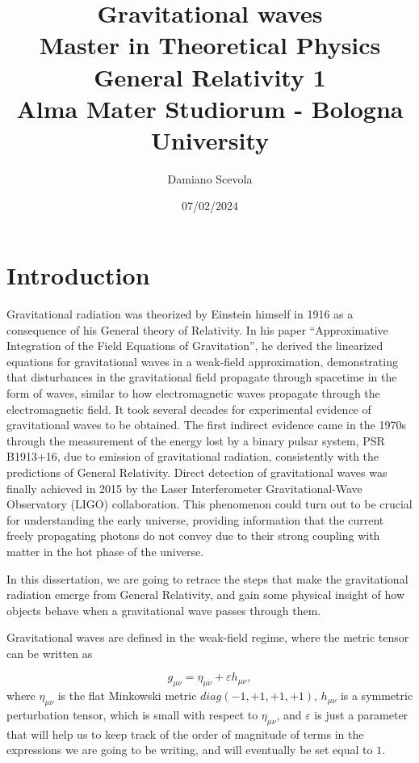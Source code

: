 \documentclass[a4paper]{article}
\title{Gravitational waves\\\linespread{1.5}
\small Master in Theoretical Physics\\
General Relativity 1\\
Alma Mater Studiorum - Bologna University}
\author{Damiano Scevola}
\date{07/02/2024}
\begin{document}
\maketitle


\section{Introduction}
Gravitational radiation was theorized by Einstein himself in 1916 as a consequence of his General theory of Relativity. In his paper ``Approximative Integration of the Field Equations of Gravitation'', he derived the linearized equations for gravitational waves in a weak-field approximation, demonstrating that disturbances in the gravitational field propagate through spacetime in the form of waves, similar to how electromagnetic waves propagate through the electromagnetic field. It took several decades for experimental evidence of gravitational waves to be obtained. The first indirect evidence came in the 1970s through the measurement of the energy lost by a binary pulsar system, PSR B1913+16, due to emission of gravitational radiation, consistently with the predictions of General Relativity. Direct detection of gravitational waves was finally achieved in 2015 by the Laser Interferometer Gravitational-Wave Observatory (LIGO) collaboration. This phenomenon could turn out to be crucial for understanding the early universe, providing information that the current freely propagating photons do not convey due to their strong coupling with matter in the hot phase of the universe.

In this dissertation, we are going to retrace the steps that make the gravitational radiation emerge from General Relativity, and gain some physical insight of how objects behave when a gravitational wave passes through them.

Gravitational waves are defined in the weak-field regime, where the metric tensor can be written as

\begin{equation}
  g_{\mu\nu} = \eta_{\mu\nu} + \varepsilon h_{\mu\nu},
  \label{eq:metric-weak}
\end{equation}
where $\eta_{\mu\nu}$ is the flat Minkowski metric $diag(-1,+1,+1,+1)$, $h_{\mu\nu}$ is a symmetric perturbation tensor, which is small with respect to $\eta_{\mu\nu}$, and $\varepsilon$ is just a parameter that will help us to keep track of the order of magnitude of terms in the expressions we are going to be writing, and will eventually be set equal to $1$.
\end{document}
